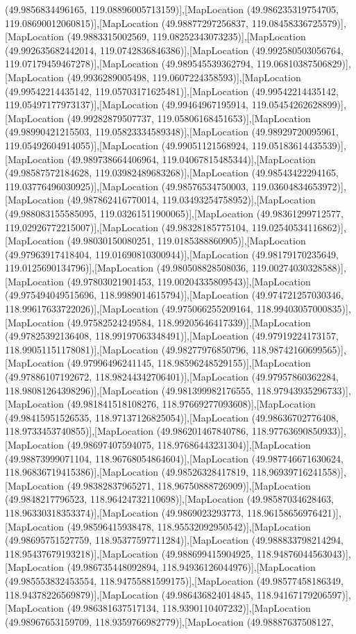 (49.9856834496165, 119.08896005713159)],[MapLocation (49.986235319754705, 119.08690012060815)],[MapLocation (49.98877297256837, 119.08458336725579)],[MapLocation (49.9883315002569, 119.08252343073235)],[MapLocation (49.992635682442014, 119.0742836846386)],[MapLocation (49.992580503056764, 119.07179459467278)],[MapLocation (49.989545539362794, 119.06810387506829)],[MapLocation (49.9936289005498, 119.0607224358593)],[MapLocation (49.99542214435142, 119.05703171625481)],[MapLocation (49.99542214435142, 119.05497177973137)],[MapLocation (49.99464967195914, 119.05454262628899)],[MapLocation (49.99282879507737, 119.05806168451653)],[MapLocation (49.98990421215503, 119.05823334589348)],[MapLocation (49.98929720095961, 119.05492604914055)],[MapLocation (49.99051121568924, 119.05183614435539)],[MapLocation (49.989738664406964, 119.04067815485344)],[MapLocation (49.98587572184628, 119.03982489683268)],[MapLocation (49.98543422294165, 119.03776496030925)],[MapLocation (49.98576534750003, 119.03604834653972)],[MapLocation (49.987862416770014, 119.03493254758952)],[MapLocation (49.988083155585095, 119.03261511900065)],[MapLocation (49.98361299712577, 119.02926772215007)],[MapLocation (49.98328185775104, 119.02540534116862)],[MapLocation (49.98030150080251, 119.0185388860905)],[MapLocation (49.97963917418404, 119.01690810300944)],[MapLocation (49.98179170235649, 119.0125690134796)],[MapLocation (49.980508828508036, 119.00274030328588)],[MapLocation (49.97803021901453, 119.00204335809543)],[MapLocation (49.975494049515696, 118.9989014615794)],[MapLocation (49.974721257030346, 118.99617633722026)],[MapLocation (49.975066255209164, 118.99403057000835)],[MapLocation (49.97582524249584, 118.99205646417339)],[MapLocation (49.97825392136408, 118.99197063348491)],[MapLocation (49.97919224173157, 118.99051151178081)],[MapLocation (49.98277976850796, 118.98742160699565)],[MapLocation (49.97996496241145, 118.98596248529155)],[MapLocation (49.97886107192672, 118.98244342706401)],[MapLocation (49.97957860362284, 118.98081264398296)],[MapLocation (49.981399982176555, 118.97943935296733)],[MapLocation (49.981841518108276, 118.97669277093608)],[MapLocation (49.98415951526535, 118.97137126825054)],[MapLocation (49.98636702776408, 118.9733453740855)],[MapLocation (49.986201467840786, 118.97763690850933)],[MapLocation (49.98697407594075, 118.97686443231304)],[MapLocation (49.98873999071104, 118.96768054864604)],[MapLocation (49.987746671630624, 118.96836719415386)],[MapLocation (49.98526328417819, 118.96939716241558)],[MapLocation (49.98382837965271, 118.96750888726909)],[MapLocation (49.9848217796523, 118.96424732110698)],[MapLocation (49.98587034628463, 118.96330318353374)],[MapLocation (49.9869023293773, 118.96158656976421)],[MapLocation (49.98596415938478, 118.95532092950542)],[MapLocation (49.98695751527759, 118.95377597711284)],[MapLocation (49.988833798214294, 118.95437679193218)],[MapLocation (49.988699415904925, 118.94876044563043)],[MapLocation (49.986735448092894, 118.94936126044976)],[MapLocation (49.985553832453554, 118.94755881599175)],[MapLocation (49.98577458186349, 118.94378226569879)],[MapLocation (49.986436824014845, 118.94167179206597)],[MapLocation (49.986381637517134, 118.9390110407232)],[MapLocation (49.98967653159709, 118.9359766982779)],[MapLocation (49.98887637508127, 